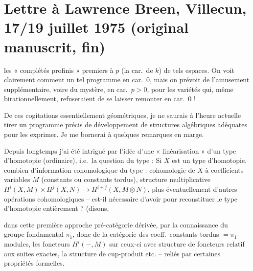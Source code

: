 \documentclass[11pt,a4paper]{article}
\begin{document}
\section{Lettre à Lawrence Breen, Villecun, 17/19 juillet 1975 (original manuscrit, fin)}

les « complétés profinis »  premiers à $p$ (la car.\ de $k$) de tels espaces. On voit clairement comment  un tel programme en car.~$0$, mais on prévoit de l'amusement supplémentaire, voire du mystère, en car.\ $p > 0$, pour les variétés qui, même birationnellement, refuseraient de se laisser remonter en car.~$0$ !

De ces cogitations essentiellement géométriques, je ne saurais à l'heure actuelle tirer un programme précis de développement de structures algébriques adéquates pour les exprimer. Je me bornerai à quelques remarques en marge.

\struck{\ill{}} Depuis longtemps j'ai été intrigué par l'idée d'une « linéarisation » d'un type d'homotopie (ordinaire), i.e.\ la question du type : Si $X$ est un type d'homotopie, combien d'information cohomologique du type : cohomologie de $X$ à coefficients variables $M$ (constants ou constants tordus), structure multiplicative $H^i(X, M) \times H^j(X, N) \to H^{i+j}(X, M \otimes N)$, plus éventuellement d'autres opérations cohomologiques -- est-il nécessaire d'avoir pour reconstituer le type d'homotopie entièrement ? (disons,

dans cette première approche pré-catégorie dérivée, par la connaissance du groupe fondamental $\pi_1$, donc de la catégorie des coeff.\ constants tordus $= \pi_1$-modules, les foncteurs $H^i(-, M)$ sur ceux-ci avec  structure de foncteurs   relatif aux suites exactes, la structure de cup-produit etc. -- reliés par certaines propriétés formelles.
\end{document}

